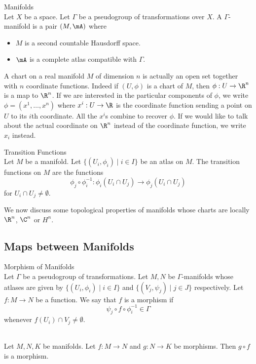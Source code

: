 \documentclass[a4paper]{article}
\begin{document}
\begin{defn}{Manifolds}{}\\
Let $X$ be a space. Let $\Gamma$ be a pseudogroup of transformations over $X$. A $\Gamma$-manifold is a pair $(M,\mA)$ where
\begin{itemize}
\item $M$ is a second countable Hausdorff space. 
\item $\mA$ is a complete atlas compatible with $\Gamma$. 
\end{itemize}
\end{defn}

A chart on a real manifold $M$ of dimension $n$ is actually an open set together with $n$ coordinate functions. Indeed if $(U,\phi)$ is a chart of $M$, then $\phi:U\to\R^n$ is a map to $\R^n$. If we are interested in the particular components of $\phi$, we write $\phi=(x^1,\dots,x^n)$ where $x^i:U\to\R$ is the coordinate function sending a point on $U$ to its $i$th coordinate. All the $x^i$s combine to recover $\phi$. If we would like to talk about the actual coordinate on $\R^n$ instead of the coordinate function, we write $x_i$ instead. 

\begin{defn}{Transition Functions}{}\\
Let $M$ be a manifold. Let $\{(U_i,\phi_i)\;|\;i\in I\}$ be an atlas on $M$. The transition functions on $M$ are the functions $$\phi_j\circ\phi_i^{-1}:\phi_i(U_i\cap U_j)\to\phi_j(U_i\cap U_j)$$ for $U_i\cap U_j\neq\emptyset$. 
\end{defn}

We now discuss some topological properties of manifolds whose charts are locally $\R^n$, $\C^n$ or $H^n$. 

\subsection{Maps between Manifolds}
\begin{defn}{Morphism of Manifolds}{}\\
Let $\Gamma$ be a pseudogroup of transformations. Let $M,N$ be $\Gamma$-manifolds whose atlases are given by $\{(U_i,\phi_i)\;|\;i\in I\}$ and $\{(V_j,\psi_j)\;|\;j\in J\}$ respectively. Let $f:M\to N$ be a function. We say that $f$ is a morphism if $$\psi_j\circ f\circ\phi_i^{-1}\in\Gamma$$ whenever $f(U_i)\cap V_j\neq\emptyset$. 
\end{defn}

\begin{lmm}{}{}\\
Let $M,N,K$ be manifolds. Let $f:M\to N$ and $g:N\to K$ be morphisms. Then $g\circ f$ is a morphism. 
\end{lmm}
\end{document}
